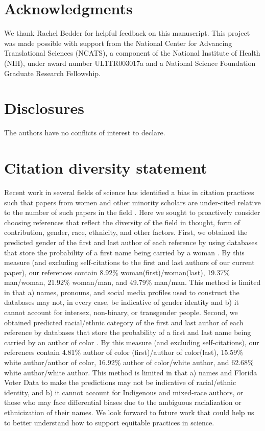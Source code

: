 \documentclass[a4paper,12pt]{article}
\begin{document}
\section{Acknowledgments}

We thank Rachel Bedder for helpful feedback on this manuscript. This project was made possible with support from the National Center for Advancing Translational Sciences (NCATS), a component of the National Institute of Health (NIH), under award number UL1TR003017a and a National Science Foundation Graduate Research Fellowship.

\section{Disclosures}

The authors have no conflicts of interest to declare.

\section{Citation diversity statement}

Recent work in several fields of science has identified a bias in citation practices such that papers from women and other minority scholars are under-cited relative to the number of such papers in the field \cite{dworkin2020extent, bertolero2020racial}. Here we sought to proactively consider choosing references that reflect the diversity of the field in thought, form of contribution, gender, race, ethnicity, and other factors. First, we obtained the predicted gender of the first and last author of each reference by using databases that store the probability of a first name being carried by a woman \cite{dworkin2020extent}. By this measure (and excluding self-citations to the first and last authors of our current paper), our references contain 8.92\% woman(first)/woman(last), 19.37\% man/woman, 21.92\% woman/man, and 49.79\% man/man. This method is limited in that a) names, pronouns, and social media profiles used to construct the databases may not, in every case, be indicative of gender identity and b) it cannot account for intersex, non-binary, or transgender people. Second, we obtained predicted racial/ethnic category of the first and last author of each reference by databases that store the probability of a first and last name being carried by an author of color \cite{ambekar2009name, sood2018predicting}. By this measure (and excluding self-citations), our references contain 4.81\% author of color (first)/author of color(last), 15.59\% white author/author of color, 16.92\% author of color/white author, and 62.68\% white author/white author. This method is limited in that a) names and Florida Voter Data to make the predictions may not be indicative of racial/ethnic identity, and b) it cannot account for Indigenous and mixed-race authors, or those who may face differential biases due to the ambiguous racialization or ethnicization of their names.  We look forward to future work that could help us to better understand how to support equitable practices in science.

\printbibliography
\end{document}

